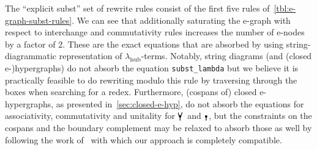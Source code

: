 The \enquote{explicit subst} set of rewrite rules consist of the first five rules of~\autoref{tbl:e-graph-subst-rules}.
We can see that additionally saturating the e-graph with respect to interchange and commutativity rules increases the number of e-nodes by a factor of 2.
These are the exact equations that are absorbed by using string-diagrammatic representation of $\lambda_{\text{lsub}}$-terms.
Notably, string diagrams (and (closed e-)hypergraphs) do not absorb the equation \texttt{subst\_lambda} but we believe it is practically feasible to do rewriting modulo this rule by traversing through the boxes when searching for a redex.
Furthermore, (cospans of) closed e-hypergraphs, as presented in~\autoref{sec:closed-e-hyp}, do not absorb the equations for associativity, commutativity and unitality for $\comonoid$ and $\counit$, but the constraints on the cospans and the boundary complement may be relaxed to absorb those as well by following the work of~\cite{zanassi_comonoid} with which our approach is completely compatible.
